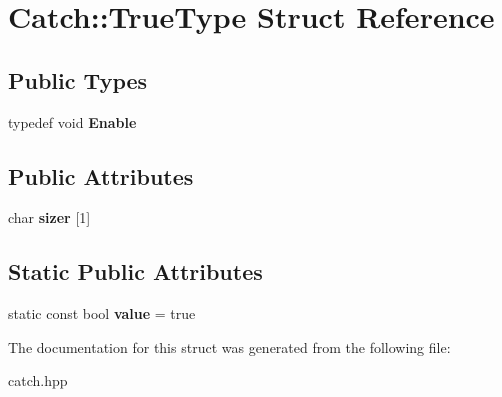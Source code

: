 \hypertarget{structCatch_1_1TrueType}{
\section{Catch::TrueType Struct Reference}
\label{structCatch_1_1TrueType}
}
\subsection*{Public Types}
\begin{DoxyCompactItemize}
\item 
\hypertarget{structCatch_1_1TrueType_a1c370b2ef39036c053357b868ef94a97}{
typedef void {\bfseries Enable}}
\label{structCatch_1_1TrueType_a1c370b2ef39036c053357b868ef94a97}

\end{DoxyCompactItemize}
\subsection*{Public Attributes}
\begin{DoxyCompactItemize}
\item 
\hypertarget{structCatch_1_1TrueType_a8a7ed3be2e763d614e7d1f0cd18219d1}{
char {\bfseries sizer} \mbox{[}1\mbox{]}}
\label{structCatch_1_1TrueType_a8a7ed3be2e763d614e7d1f0cd18219d1}

\end{DoxyCompactItemize}
\subsection*{Static Public Attributes}
\begin{DoxyCompactItemize}
\item 
\hypertarget{structCatch_1_1TrueType_ac7b4114d6c6d3d4ff8d2df67f243d2be}{
static const bool {\bfseries value} = true}
\label{structCatch_1_1TrueType_ac7b4114d6c6d3d4ff8d2df67f243d2be}

\end{DoxyCompactItemize}


The documentation for this struct was generated from the following file:\begin{DoxyCompactItemize}
\item 
catch.hpp\end{DoxyCompactItemize}
